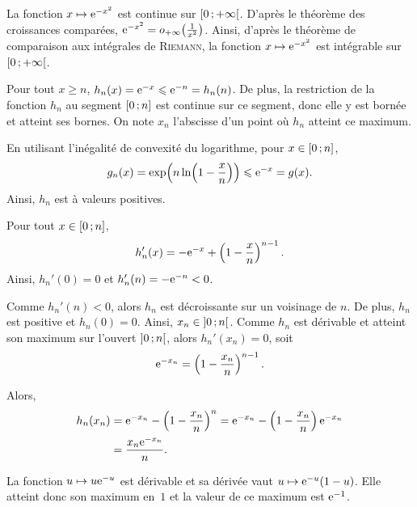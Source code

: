\begin{solution}
\begin{reponses}
\item La fonction $x \mapsto \mathrm{e}^{-x^2}$ est continue sur $\left[0\,;+\infty\right[$. D'après le théorème des croissances comparées, \mbox{$\mathrm{e}^{-x^2} = o_{+\infty}\mathopen{}\left(\frac{1}{x^2}\right)$}. Ainsi, d'après le théorème de comparaison aux intégrales de \textsc{Riemann}, la fonction $x \mapsto \mathrm{e}^{-x^2}$ est intégrable sur $\left[0\,;+\infty\right[$.

\item
\begin{reponses}
\item Pour tout $x \geqslant n$, $h_n(x) = \mathrm{e}^{-x} \leqslant \mathrm{e}^{-n} = h_n(n)$. De plus, la restriction de la fonction $h_n$ au segment $\left[0\,;n\right]$ est continue sur ce segment, donc elle y est bornée et atteint ses bornes. On note $x_n$ l'abscisse d'un point où $h_n$ atteint ce maximum.

\item {}En utilisant l'inégalité de convexité du logarithme, pour $x \in \left[0\,;n\right]$,
\[
g_n(x)
= \exp\mathopen{}\left(n \ln\mathopen{}\left(1 - \frac{x}{n}\right)\right)
\leqslant \mathrm{e}^{-x} = g(x).
\]
Ainsi, $h_n$ est à valeurs positives.

\item Pour tout $x \in \left[0\,;n\right]$,
\[
h_n'(x) = -\mathrm{e}^{-x} + \left(1 - \frac{x}{n}\right)^{n-1}.
\]
Ainsi, $h_n'(0) = 0$ et $h_n'(n) = - \mathrm{e}^{-n} < 0$.

Comme $h_n'(n) < 0$, alors $h_n$ est décroissante sur un voisinage de $n$. De plus, $h_n$ est positive et $h_n(0) = 0$. Ainsi, $x_n \in \left]0\,;n\right[$. Comme $h_n$ est dérivable et atteint son maximum sur l'ouvert $\left]0\,;n\right[$, alors $h_n'(x_n) = 0$, soit
\[
\mathrm{e}^{-x_n} = \left(1 - \frac{x_n}{n}\right)^{n-1}.
\]

Alors,
\begin{align*}
h_n(x_n)
&= \mathrm{e}^{-x_n} - \left(1 - \frac{x_n}{n}\right)^n
= \mathrm{e}^{-x_n} - \left(1 - \frac{x_n}{n}\right) \mathrm{e}^{-x_n}\\
&= \frac{x_n \mathrm{e}^{-x_n}}{n}.
\end{align*}

\item La fonction $u \mapsto u \mathrm{e}^{-u}$ est dérivable et sa dérivée vaut $u \mapsto \mathrm{e}^{-u} (1 - u)$. Elle atteint donc son maximum en~$1$ et la valeur de ce maximum est $\mathrm{e}^{-1}$.


\end{reponses}
\end{reponses}
\end{solution}
